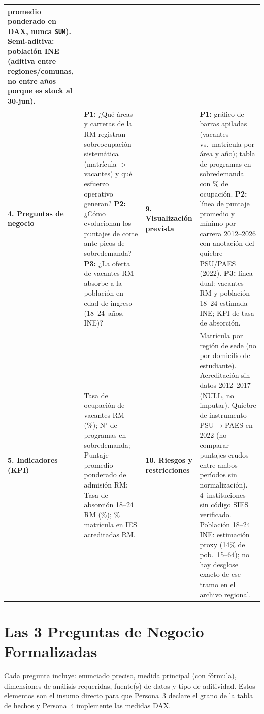 \documentclass[11pt,a4paper]{article}
\begin{document}
\begin{center}
\begin{tabularx}{\textwidth}{|>{}p{3.0cm}|Y|>{}p{3.0cm}|Y|}
  promedio ponderado en DAX, nunca \texttt{SUM}).
  \textbf{Semi-aditiva:} población INE (aditiva entre regiones/comunas,
  no entre años porque es stock al 30-jun). \\
\hline
\textbf{\color{primaryblue}4. Preguntas de negocio} &
  \textbf{P1:} ¿Qué áreas y carreras de la RM registran sobreocupación
  sistemática (matrícula $>$ vacantes) y qué esfuerzo operativo generan?
  \textbf{P2:} ¿Cómo evolucionan los puntajes de corte ante picos de
  sobredemanda?
  \textbf{P3:} ¿La oferta de vacantes RM absorbe a la población en edad
  de ingreso (18--24~años, INE)? &
\textbf{\color{primaryblue}9. Visualización prevista} &
  \textbf{P1:} gráfico de barras apiladas (vacantes vs.\ matrícula por área
  y año); tabla de programas en sobredemanda con \% de ocupación.
  \textbf{P2:} línea de puntaje promedio y mínimo por carrera 2012--2026
  con anotación del quiebre PSU/PAES (2022).
  \textbf{P3:} línea dual: vacantes RM y población 18--24 estimada INE;
  KPI de tasa de absorción. \\
\hline
\textbf{\color{primaryblue}5. Indicadores (KPI)} &
  Tasa de ocupación de vacantes RM (\%);
  N$^{\circ}$ de programas en sobredemanda;
  Puntaje promedio ponderado de admisión RM;
  Tasa de absorción 18--24 RM (\%);
  \% matrícula en IES acreditadas RM. &
\textbf{\color{primaryblue}10. Riesgos y restricciones} &
  Matrícula por región de sede (no por domicilio del estudiante).
  Acreditación sin datos 2012--2017 (NULL, no imputar).
  Quiebre de instrumento PSU$\to$PAES en 2022 (no comparar puntajes
  crudos entre ambos períodos sin normalización).
  4~instituciones sin código SIES verificado.
  Población 18--24 INE: estimación proxy (14\% de pob.\ 15--64);
  no hay desglose exacto de ese tramo en el archivo regional. \\
\hline
\end{tabularx}
\end{center}

\section{Las 3 Preguntas de Negocio Formalizadas}
\label{sec:preguntas}

\begin{tcolorbox}[colback=lightbg, colframe=secondaryblue,
    title=\textbf{Criterio de formalización}]
Cada pregunta incluye: enunciado preciso, medida principal (con fórmula),
dimensiones de análisis requeridas, fuente(s) de datos y tipo de aditividad.
Estos elementos son el insumo directo para que Persona~3 declare el grano
de la tabla de hechos y Persona~4 implemente las medidas DAX.
\end{tcolorbox}
\end{document}
